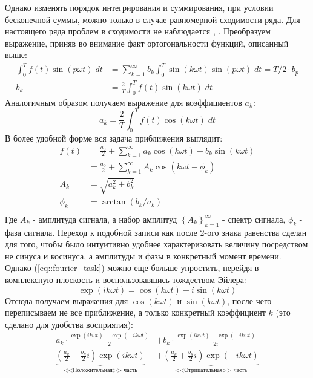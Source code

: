 Однако изменять порядок интегрирования и суммирования, при условии бесконечной суммы, можно только в случае равномерной сходимости ряда. Для настоящего ряда проблем в сходимости не наблюдается \cite{teljacovski2001convergence}, \cite{mipt2004fourier}. Преобразуем выражение, приняв во внимание факт ортогональности функций, описанный выше:
\begin{equation}
	\begin{split}
		\int_{0}^T f(t) \sin(p \omega t) \; dt & = \sum_{k = 1}^{\infty} b_k \int_0^T \sin(k \omega t)\sin(p \omega t) \; dt = T / 2  \cdot b_p \\
		b_k & = \frac{2}{T}  \int_{0}^T f(t) \sin(k \omega t) \; dt 
	\end{split}
\end{equation}
Аналогичным образом получаем выражение для коэффициентов $a_k$:
\begin{equation}
	a_k = \frac{2}{T}  \int_{0}^T f(t) \cos(k \omega t) \; dt 
\end{equation}
В более удобной форме вся задача приближения выглядит:
\begin{equation} \label{eq::fourier_task}
	\begin{split}
		f(t) & = \frac{a_0}{2} + \sum_{k = 1}^{\infty} a_k\cos(k \omega t) + b_k\sin(k \omega t)\\
		& = \frac{a_0}{2} + \sum_{k = 1}^{\infty} A_k \cos(k \omega t - \phi_k)\\
		A_k & = \sqrt{a_k^2 + b_k^2}\\
		\phi_k & = \arctan(b_k / a_k)\\
	\end{split}
\end{equation}
Где $A_k$ - амплитуда сигнала, а набор амплитуд $\left\{A_k\right\}_{k = 1}^\infty$ - спектр сигнала, $\phi_k$ - фаза сигнала. Переход к подобной записи как после 2-ого знака равенства сделан для того, чтобы было интуитивно удобнее характеризовать величину посредством не синуса и косинуса, а амплитуды и фазы в конкретный момент времени. Однако (\ref{eq::fourier_task}) можно еще больше упростить, перейдя в комплексную плоскость и воспользовавшись тождеством Эйлера:
\begin{equation}
	\exp(i k \omega t) = \cos(k \omega t) + i \sin(k \omega t)
\end{equation}
Отсюда получаем выражения для $\cos(k \omega t)$ и $\sin(k \omega t)$, после чего переписываем не все приближение, а только конкретный коэффициент $k$ (это сделано для удобства восприятия):
\begin{equation}
	\begin{split}
		a_k \cdot \frac{\exp(i k \omega t) + \exp(-i k \omega t)}{2} & + b_k \cdot \frac{\exp(i k \omega t) - \exp(-i k \omega t)}{2i}\\
		\underbrace{\left( \frac{a_k}{2} - \frac{b_k}{2} i \right) \exp(i k \omega t)}_{\text{<<Положительная>> часть}} & + \underbrace{\left( \frac{a_k}{2} + \frac{b_k}{2} i \right) \exp(-i k \omega t)}_{\text{<<Отрицательная>> часть}}
	\end{split}
\end{equation}

